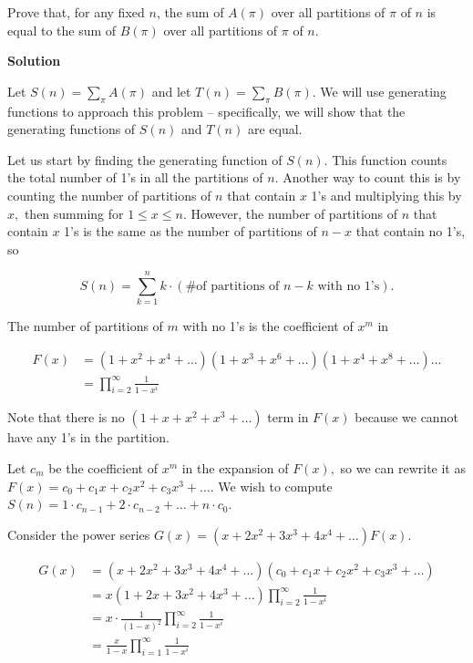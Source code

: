 \begin{enumerate}
 Prove that, for any fixed $n$, the sum of $A(\pi)$ over all partitions of $\pi$ of $n$ is equal to the sum of $B(\pi)$ over all partitions of $\pi$ of $n$.


 



\textbf{Solution}

Let $S(n) = \sum\limits_{\pi} A(\pi)$ and let $T(n) = \sum\limits_{\pi} B(\pi).$ We will use generating functions to approach this problem -- specifically, we will show that the generating functions of $S(n)$ and $T(n)$ are equal.

 Let us start by finding the generating function of $S(n).$ This function counts the total number of 1's in all the partitions of $n.$ Another way to count this is by counting the number of partitions of $n$ that contain $x$ 1's and multiplying this by $x,$ then summing for $1\leq x \leq n.$ However, the number of partitions of $n$ that contain $x$ 1's is the same as the number of partitions of $n-x$ that contain no 1's, so

 
 \[S(n) = \sum_{k=1}^n k\cdot (\text{\# of partitions of }n-k\text{ with no 1's}).\]

 The number of partitions of $m$ with no 1's is the coefficient of $x^m$ in 

 
 \begin{align*} F(x) &= (1+x^2+x^4+\ldots)(1+x^3+x^6+\ldots)(1+x^4+x^8+\ldots)\ldots \\ &= \prod\limits_{i=2}^{\infty}\frac{1}{1-x^i} \end{align*}


 Note that there is no $(1+x+x^2+x^3+\ldots)$ term in $F(x)$ because we cannot have any 1's in the partition.

 Let $c_m$ be the coefficient of $x^m$ in the expansion of $F(x),$ so we can rewrite it as $F(x)=c_0+c_1x+c_2x^2+c_3x^3+\ldots.$ We wish to compute $S(n)=1\cdot c_{n-1}+2\cdot c_{n-2}+\ldots+n\cdot c_0.$ 

 Consider the power series $G(x)=(x+2x^2+3x^3+4x^4+\ldots)F(x).$

 \begin{align*} G(x) &= (x+2x^2+3x^3+4x^4+\ldots)(c_0+c_1x+c_2x^2+c_3x^3+\ldots)\\ &= x(1+2x+3x^2+4x^3+\ldots) \prod\limits_{i=2}^{\infty}\frac{1}{1-x^i}\\ &= x\cdot\frac{1}{(1-x)^2} \prod\limits_{i=2}^{\infty}\frac{1}{1-x^i}\\ &= \frac{x}{1-x} \prod\limits_{i=1}^{\infty}\frac{1}{1-x^i} \end{align*}



\end{enumerate}
